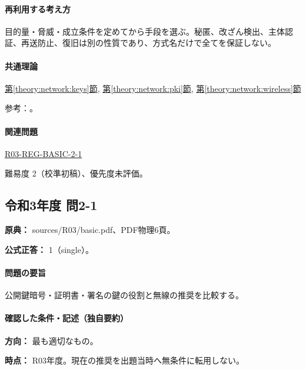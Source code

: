 \paragraph{再利用する考え方} 目的量・脅威・成立条件を定めてから手段を選ぶ。秘匿、改ざん検出、主体認証、再送防止、復旧は別の性質であり、方式名だけで全てを保証しない。

\paragraph{共通理論} \hyperref[theory:network:keys]{第\ref*{theory:network:keys}節}, \hyperref[theory:network:pki]{第\ref*{theory:network:pki}節}, \hyperref[theory:network:wireless]{第\ref*{theory:network:wireless}節}

\par 参考：\cite{net_pki,net_signature,net_wep}。

\paragraph{関連問題} \hyperref[q:r03-reg-basic-2-1]{R03-REG-BASIC-2-1}

\par 難易度 2（校準初稿）、優先度未評価。

\subsection{令和3年度 問2-1}
\label{q:r03-reg-basic-2-1}

\noindent\textbf{原典：} sources/R03/basic.pdf、PDF物理6頁。

\textbf{公式正答：} 1（single）。

\paragraph{問題の要旨} 公開鍵暗号・証明書・署名の鍵の役割と無線の推奨を比較する。

\paragraph{確認した条件・記述（独自要約）}\mbox{}\par

\noindent\textbf{方向：} 最も適切なもの。\par

\noindent\textbf{時点：} R03年度。現在の推奨を出題当時へ無条件に転用しない。\par

